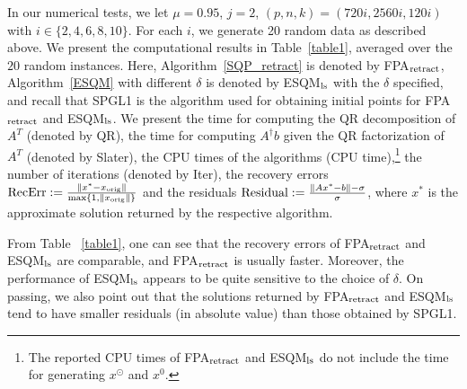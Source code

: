 \documentclass[10pt]{article}
\numberwithin{equation}{section}
\def\R{{\rm I\!R}}
\def\xfeas{x^\odot}
\def\xorig{{x_{\rm orig}}}
\begin{document}

In our numerical tests, we let $\mu =0.95$, {\color{black}$j = 2$, $(p,n,k) = (720i,2560i,120i)$} with $i\in \{2, 4, 6, 8, 10\}$. For each $i$, we generate {\color{black}20 random data} as described above. We present the computational results in Table~\ref{table1}, averaged over the {\color{black}$20$ random instances}. Here, Algorithm~\ref{SQP_retract} is denoted by FPA$_{\rm retract}$, Algorithm~\ref{ESQM} with different $\delta$ is denoted by ESQM$_{\rm ls}$ with the $\delta$ specified, and recall that SPGL1 is the algorithm used for obtaining initial points for FPA$_{\rm retract}$ and ESQM$_{\rm ls}$. We present the time for computing the QR decomposition of $A^T$ (denoted by QR), the time for computing $A^\dagger b$ given the QR factorization of $A^T$ (denoted by Slater), the CPU times of the algorithms (CPU time),\footnote{The reported CPU times of FPA$_{\rm retract}$ and ESQM$_{\rm ls}$ do not include the time for generating $\xfeas$ and $x^0$.} the number of iterations (denoted by Iter), the recovery errors $\text{RecErr} := \frac{\|x^* - \xorig\|}{\max\{1, \|\xorig\|\}}$ and the residuals ${\rm Residual} := \frac{\|Ax^* - b\| - \sigma }{\sigma}$, where $x^*$ is the approximate solution returned by the respective algorithm.

From Table ~\ref{table1}, one can see that the recovery errors of FPA$_{\rm retract}$ and ESQM$_{\rm ls}$ are comparable, and FPA$_{\rm retract}$ is usually faster. Moreover, the performance of ESQM$_{\rm ls}$ appears to be quite sensitive to the choice of $\delta$. {\color{black}On passing, we also point out that the solutions returned by FPA$_{\rm retract}$ and ESQM$_{\rm ls}$ tend to have smaller residuals (in absolute value) than those obtained by SPGL1.}

\end{document}
